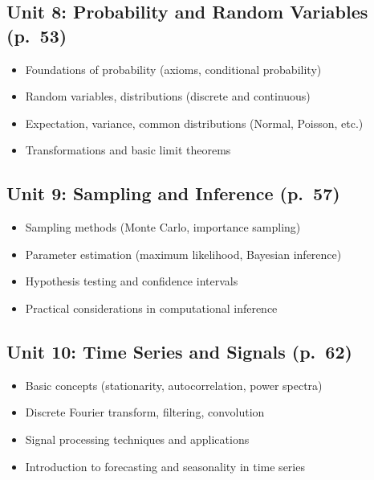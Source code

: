 \documentclass{article}
\begin{document}
\subsection*{Unit 8: Probability and Random Variables (p.~53)}
\begin{itemize}
    \item Foundations of probability (axioms, conditional probability)
    \item Random variables, distributions (discrete and continuous)
    \item Expectation, variance, common distributions (Normal, Poisson, etc.)
    \item Transformations and basic limit theorems
\end{itemize}

\subsection*{Unit 9: Sampling and Inference (p.~57)}
\begin{itemize}
    \item Sampling methods (Monte Carlo, importance sampling)
    \item Parameter estimation (maximum likelihood, Bayesian inference)
    \item Hypothesis testing and confidence intervals
    \item Practical considerations in computational inference
\end{itemize}

\subsection*{Unit 10: Time Series and Signals (p.~62)}
\begin{itemize}
    \item Basic concepts (stationarity, autocorrelation, power spectra)
    \item Discrete Fourier transform, filtering, convolution
    \item Signal processing techniques and applications
    \item Introduction to forecasting and seasonality in time series
\end{itemize}
\end{document}
